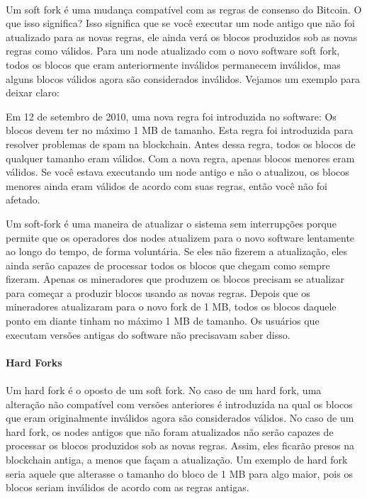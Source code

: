 \paragraph{}

Um soft fork é uma mudança compatível com as regras de consenso do Bitcoin. O que isso significa? Isso significa que se você executar um node antigo que não foi atualizado para as novas regras, ele ainda verá os blocos produzidos sob as novas regras como válidos. Para um node atualizado com o novo software soft fork, todos os blocos que eram anteriormente inválidos permanecem inválidos, mas alguns blocos válidos agora são considerados inválidos. Vejamos um exemplo para deixar claro:

Em 12 de setembro de 2010, uma nova regra foi introduzida no software: Os blocos devem ter no máximo 1 MB de tamanho. Esta regra foi introduzida para resolver problemas de spam na blockchain. Antes dessa regra, todos os blocos de qualquer tamanho eram válidos. Com a nova regra, apenas blocos menores eram válidos. Se você estava executando um node antigo e não o atualizou, os blocos menores ainda eram válidos de acordo com suas regras, então você não foi afetado.

Um soft-fork é uma maneira de atualizar o sistema sem interrupções porque permite que os operadores dos nodes atualizem para o novo software lentamente ao longo do tempo, de forma voluntária. Se eles não fizerem a atualização, eles ainda serão capazes de processar todos os blocos que chegam como sempre fizeram. Apenas os  mineradores que produzem os blocos precisam se atualizar para começar a produzir blocos usando as novas regras. Depois que os mineradores atualizaram para o novo fork de 1 MB, todos os blocos daquele ponto em diante tinham no máximo 1 MB de tamanho. Os usuários que executam versões antigas do software não precisavam saber disso.


\paragraph{Hard Forks}
\paragraph{}

Um hard fork é o oposto de um soft fork. No caso de um hard fork, uma alteração não compatível com versões anteriores é introduzida na qual os blocos que eram originalmente inválidos agora são considerados válidos. No caso de um hard fork, os nodes antigos que não foram atualizados não serão capazes de processar os blocos produzidos sob as novas regras. Assim, eles ficarão presos na blockchain antiga, a menos que façam a atualização. Um exemplo de hard fork seria aquele que alterasse o tamanho do bloco de 1 MB para algo maior, pois os blocos seriam inválidos de acordo com as regras antigas.


